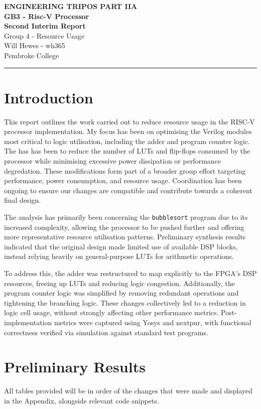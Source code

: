 \documentclass[a4paper,10pt]{article}
\renewcommand{\maketitle}{
    \begin{center}
        \LARGE \textbf{ENGINEERING TRIPOS PART IIA} \\ 
        \vspace{0.5em}
        \Large \textbf{GB3 - Risc-V Processor} \\ 
        \vspace{0.5em}
        \textbf{Second Interim Report} \\
        \large Group 4 - Resource Usage \\
        \vspace{1em}
        \large Will Hewes - wh365 \\ 
        Pembroke College \\ 
        \vspace{0.5em}
    \end{center}
}
\begin{document}

\maketitle
\hrule
\tableofcontents
\newpage

\section{Introduction}
\label{sec:Introduction}

This report outlines the work carried out to reduce resource usage 
in the RISC-V processor implementation. 
My focus has been on optimising the Verilog modules 
most critical to logic utilisation, including the adder and program counter logic. 
The has has been to reduce the number of LUTs and flip-flops consumed
by the processor while minimising 
excessive power dissipation or performance degredation.
These modifications form part of a broader group effort targeting performance, 
power consumption, and resource usage. 
Coordination has been ongoing to ensure our changes are compatible and 
contribute towards a coherent final design.

The analysis has primarily been concerning the
\texttt{bubblesort} program due to its increased complexity,
allowing the processor to be pushed further and 
offering more representative resource utilisation patterns.
Preliminary synthesis results indicated that the original design 
made limited use of available DSP blocks, 
instead relying heavily on general-purpose LUTs for arithmetic operations.

To address this, the adder was restructured to map explicitly 
to the FPGA's DSP resources, freeing up LUTs and reducing logic congestion.
Additionally, the program counter logic was simplified 
by removing redundant operations and tightening the branching logic.
These changes collectively led to a reduction in logic cell usage, 
without strongly affecting other performance metrics.
Post-implementation metrics were captured using Yosys and nextpnr, 
with functional correctness verified via simulation against standard test programs.


\section{Preliminary Results}
\label{sec:Preliminary_Results}
All tables provided will be in order of the changes that were made
and displayed in the Appendix, alongside relevant code snippets.
\end{document}
